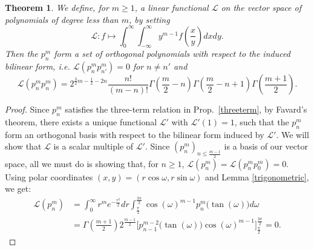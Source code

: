 \documentclass{amsart}
\newcommand{\ie}{{\it i.e. }}
\newcommand{\p}{p}
\renewcommand{\L}{\mathcal{L}}
\theoremstyle{plain}
\newtheorem{theorem}{Theorem}[section]
\theoremstyle{definition}
\theoremstyle{remark}
\begin{document}
\begin{theorem} We define, for $m\geq 1$, a linear functional $\L$ on the vector space of polynomials of degree less than $m$, by setting
\begin{equation}
\L: f \longmapsto \int_0^\infty\!\!\! \int_{-\infty}^\infty y^{m-1}f\left(\frac{x}{y}\right)dxdy.
\end{equation}
Then the $\p_n^m$ form a set of orthogonal polynomials with respect to the induced bilinear form, \ie $\L(\p_{n}^m\p_{n'}^m)=0$ for $n\neq n'$ and 
\begin{equation}
\L(\p_{n}^m\p_{n}^m) = 2^{\frac{3}{2}m-\frac{1}{2}-2n}  \frac{n!}{(m-n)!}
\Gamma\left(\frac{m}{2}-n\right)\Gamma\left(\frac{m}{2}-n+1\right)\Gamma\left(\frac{m+1}{2}\right).
\end{equation}
\end{theorem}
\begin{proof}
Since $\p_n^m$ satisfies the three-term relation in Prop.~\ref{threeterm}, by Favard's theorem, there exists a unique functional $\L'$ with $\L'(1)=1$, such that the $\p_n^m$ form an orthogonal basis with respect to the bilinear form induced by $\L'$. We will show that $\L$ is a scalar multiple of $\L'$. Since $(\p_n^m)_{n\leq\frac{m-1}{2}} $ is a basis of our vector space, all we must do is showing that, for $n\geq 1$, $\L(\p_n^m) = \L(\p_n^m\p_0^m) =0$.
Using polar coordinates $(x,y) = (r\cos\omega,r\sin\omega)$ and Lemma \ref{trigonometric}, we get:
\begin{align*}
\L(\p_n^m) &= \int_0^\infty r^m e^{-\frac{r^2}{2}}dr \int_{\frac{\pi}{2}}^{\frac{3\pi}{2}} \cos(\omega)^{m-1} p_{n}^{m}\big(\tan(\omega)\big)d\omega\\
&= \Gamma\left(\tfrac{m+1}{2}\right)2^{\frac{m-1}{2}}\Big[p_{n-1}^{m-2}\big(\tan(\omega)\big)\cos(\omega)^{m-1} \Big]_{\frac{\pi}{2}}^{\frac{3\pi}{2}} =0.
\end{align*}
\end{proof}





\end{document}
